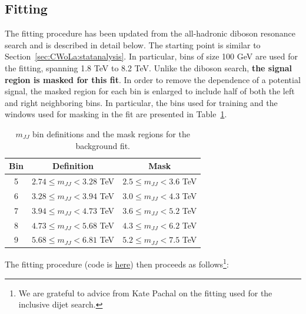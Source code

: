 \subsection{Fitting}
\label{sec:CWoLa:inverted:datafitting}

The fitting procedure has been updated from the all-hadronic diboson resonance search and is described in detail below.   The starting point is similar to Section~\ref{sec:CWoLa:statanalysis}.  In particular, bins of size 100 GeV are used for the fitting, spanning 1.8 TeV to 8.2 TeV.  Unlike the diboson search, \textbf{the signal region is masked for this fit}.  In order to remove the dependence of a potential signal, the masked region for each bin is enlarged to include half of both the left and right neighboring bins.  In particular, the bins used for training and the windows used for masking in the fit are presented in Table~\ref{tab:mjj_bins2}.

\begin{table}[htb]
  \centering
  \caption{\label{tab:mjj_bins2} $m_{JJ}$ bin definitions and the mask regions for the background fit.}
  \begin{tabular}{c c c}
    \hline
    Bin & Definition & Mask  \\ \hline
    5 & $2.74 \le m_{JJ} < 3.28$ TeV & $2.5 \le m_{JJ} < 3.6$ TeV \\
    6 & $3.28 \le m_{JJ} < 3.94$ TeV & $3.0 \le m_{JJ} < 4.3$ TeV \\
    7 & $3.94 \le m_{JJ} < 4.73$ TeV & $3.6 \le m_{JJ} < 5.2$ TeV \\
    8 & $4.73 \le m_{JJ} < 5.68$ TeV & $4.3 \le m_{JJ} < 6.2$ TeV \\
    9 & $5.68 \le m_{JJ} < 6.81$ TeV & $5.2 \le m_{JJ} < 7.5$ TeV \\
    \hline
  \end{tabular}
\end{table} 

The fitting procedure (code is \href{https://gitlab.cern.ch/cwola-hunting/fitting/tree/minimal}{here}) then proceeds as follows\footnote{We are grateful to advice from Kate Pachal on the fitting used for the inclusive dijet search.}:

